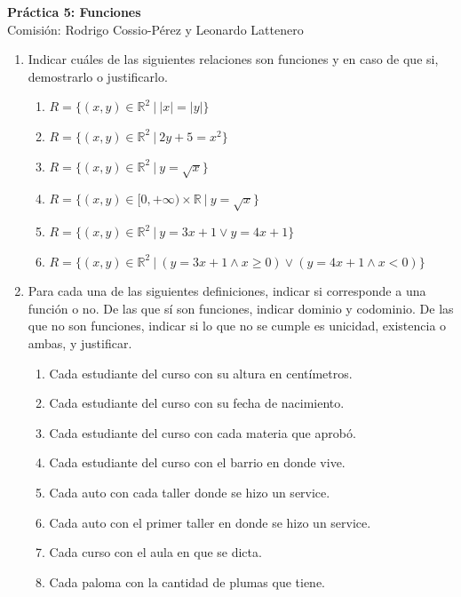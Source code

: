 \documentclass[a4paper]{article}
\newcommand{\exercise}{\item}
\begin{document}
\noindent \hrulefill 
\vspace{-7pt}
\begin{center} 
	\textbf{ Práctica 5: Funciones} \\
	Comisión: Rodrigo Cossio-Pérez y Leonardo Lattenero
\end{center}
\vspace{-10pt}
\hrulefill
\begin{enumerate}
	\exercise Indicar cuáles de las siguientes relaciones son funciones y en caso de que si, demostrarlo o justificarlo.
	\begin{enumerate} [label=(\alph*)]
		\item $R=\{(x,y)\in\mathbb{R}^2 ~|~ |x|=|y|\}$
		\item $R=\{(x,y)\in\mathbb{R}^2 ~|~ 2y+5=x^2 \}$
		\item $R=\{(x,y)\in\mathbb{R}^2 ~|~ y=\sqrt{x} \}$
		\item $R=\{(x,y)\in [0,+\infty)\times\mathbb{R} ~|~ y=\sqrt{x} \}$
		\item $R=\{(x,y)\in\mathbb{R}^2 ~|~ y=3x+1 \lor y=4x+1 \}$
		\item $R=\{(x,y)\in\mathbb{R}^2 ~|~ (y=3x+1 \land x\geq0) \lor (y=4x+1 \land x<0) \}$
	\end{enumerate}
	\exercise Para cada una de las siguientes definiciones, indicar si corresponde a una función o no. De las que sí son funciones, indicar dominio y codominio. De las que no son funciones, indicar si lo que no se cumple es unicidad, existencia o ambas, y justificar.
	\begin{enumerate} [label=(\alph*)]
		\item Cada estudiante del curso con su altura en centímetros.
		\item Cada estudiante del curso con su fecha de nacimiento.
		\item Cada estudiante del curso con cada materia que aprobó.
		\item Cada estudiante del curso con el barrio en donde vive.
		\item Cada auto con cada taller donde se hizo un service.
		\item Cada auto con el primer taller en donde se hizo un service.
		\item Cada curso con el aula en que se dicta.
		\item Cada paloma con la cantidad de plumas que tiene.

\end{enumerate}
\end{enumerate}
\end{document}
